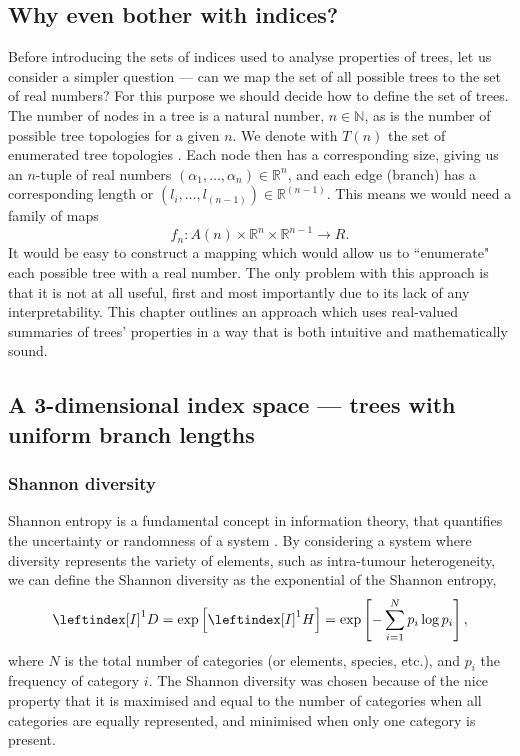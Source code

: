 \subsection{Why even bother with indices?}
Before introducing the sets of indices used to analyse properties of trees, let us consider a simpler question --- can we map the set of all possible trees to the set of real numbers? For this purpose we should decide how to define the set of trees. The number of nodes in a tree is a natural number, $n\in\mathbb{N}$, as is the number of possible tree topologies for a given $n$. We denote with $T(n)$ the set of enumerated tree topologies \cite{nakano_tree_2016}. Each node then has a corresponding size, giving us an $n$-tuple of real numbers $(\alpha_1, \dots, \alpha_n)\in\mathbb{R}^n$, and each edge (branch) has a corresponding length or $(l_i, \dots, l_{(n-1)})\in\mathbb{R}^{(n-1)}$. This means we would need a family of maps
\begin{equation}
    f_n: A(n) \times \mathbb{R}^n \times \mathbb{R}^{n-1} \rightarrow R.
\end{equation}
It would be easy to construct a mapping which would allow us to ``enumerate" each possible tree with a real number. The only problem with this approach is that it is not at all useful, first and most importantly due to its lack of any interpretability. This chapter outlines an approach which uses real-valued summaries of trees' properties in a way that is both intuitive and mathematically sound.

\subsection{A 3-dimensional index space --- trees with uniform branch lengths}
\subsubsection{Shannon diversity}
Shannon entropy is a fundamental concept in information theory, that quantifies the uncertainty or randomness of a system \cite{shannon_mathematical_1948}. By considering a system where diversity represents the variety of elements, such as intra-tumour heterogeneity, we can define the Shannon diversity as the exponential of the Shannon entropy,
\begin{equation}
    \leftindex[I]^1{D} = \exp\left[\leftindex[I]^1{H}\right] = \exp\left[-\sum_{i=1}^N p_i \log p_i\right],
\end{equation}
where $N$ is the total number of categories (or elements, species, etc.), and $p_i$ the frequency of category $i$. The Shannon diversity was chosen because of the nice property that it is maximised and equal to the number of categories when all categories are equally represented, and minimised when only one category is present.
